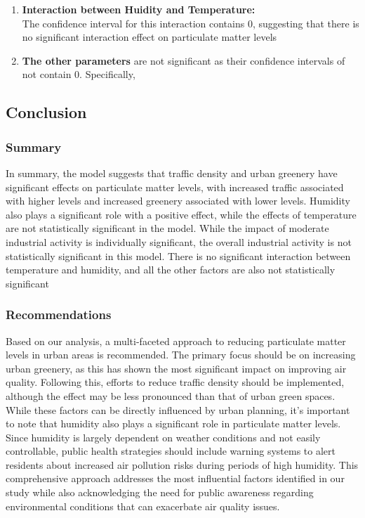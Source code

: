 \documentclass{article}
\begin{document}
\begin{enumerate}
    While moderate industrial activity showed a significant effect individually, the overall effect of industrial activity on particulate matter levels is not significant (p-value = 0.07073). This suggests that while there may be differences between specific levels of industrial activity, the variable as a whole does not have a statistically significant impact on particulate matter levels at the 0.05 significance level.
    \item \textbf{Interaction between Huidity and Temperature:} \\ The confidence interval for this interaction contains 0, suggesting that there is no significant interaction effect on particulate matter levels
    \item \textbf{The other parameters} are not significant as their confidence intervals of not contain 0. Specifically, 
\end{enumerate}
\subsection{Conclusion}
\subsubsection*{Summary}
In summary, the model suggests that traffic density and urban greenery have significant effects on particulate matter levels, with increased traffic associated with higher levels and increased greenery associated with lower levels. Humidity also plays a significant role with a positive effect, while the effects of temperature are not statistically significant in the model. While the impact of moderate industrial activity is individually significant, the overall industrial activity is not statistically significant in this model. There is no significant interaction between temperature and humidity, and all the other factors are also not statistically significant
\subsubsection*{Recommendations}
Based on our analysis, a multi-faceted approach to reducing particulate matter levels in urban areas is recommended. The primary focus should be on increasing urban greenery, as this has shown the most significant impact on improving air quality. Following this, efforts to reduce traffic density should be implemented, although the effect may be less pronounced than that of urban green spaces. While these factors can be directly influenced by urban planning, it's important to note that humidity also plays a significant role in particulate matter levels. Since humidity is largely dependent on weather conditions and not easily controllable, public health strategies should include warning systems to alert residents about increased air pollution risks during periods of high humidity. This comprehensive approach addresses the most influential factors identified in our study while also acknowledging the need for public awareness regarding environmental conditions that can exacerbate air quality issues.
\end{document}
